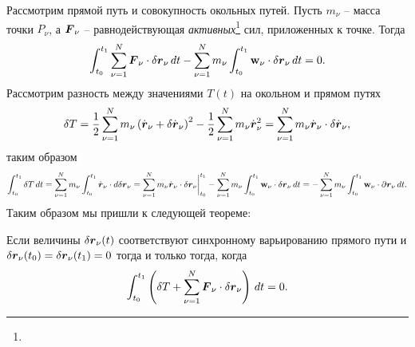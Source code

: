 Рассмотрим прямой путь и совокупность окольных путей. Пусть $m_\nu$ -- масса точки $P_\nu$, а $\mbox{\boldmath $F$}_\nu$ -- равнодействующая \textit{активных}\footnote{
} сил, приложенных к точке. Тогда
\begin{equation*}
    \int_{t_0}^{t_1} \sum_{\nu=1}^{N} \mbox{\boldmath $F$}_\nu \cdot \delta \mbox{\boldmath $r$}_\nu \, d t - 
    \sum_{\nu=1}^N m_\nu \int_{t_0}^{t_1} \mbox{\boldmath $\mathrm{w}$}_\nu \cdot \delta \mbox{\boldmath $r$}_\nu \, d t = 0.
\end{equation*}
Рассмотрим разность между значениями $T(t)$ на окольном и прямом путях
\begin{equation*}
    \delta T = \frac{1}{2} \sum_{\nu=1}^N m_\nu \left(
        \dot{\mbox{\boldmath $r$}}_\nu + \delta \dot{\mbox{\boldmath $r$}}_\nu
    \right)^2 - \frac{1}{2} \sum_{\nu=1}^N m_\nu \dot{\mbox{\boldmath $r$}}_\nu^2 = 
    \sum_{\nu=1}^N m_\nu \dot{\mbox{\boldmath $r$}}_\nu \cdot \delta \dot{\mbox{\boldmath $r$}}_\nu,
\end{equation*} 
таким образом
\begin{equation*}
     \int_{t_0}^{t_1} \delta T \, d t = \sum_{\nu=1}^N  m_\nu \int_{t_0}^{t_1} \dot{\mbox{\boldmath $r$}}_\nu \cdot d \delta \mbox{\boldmath $r$}_\nu = \sum_{\nu=1}^N m_\nu \dot{\mbox{\boldmath $r$}}_\nu \cdot \delta \mbox{\boldmath $r$}_\nu 
    \bigg|_{t_0}^{t_1} - \sum_{\nu=1}^N m_\nu \int_{t_0}^{t_1} \mbox{\boldmath $\mathrm{w}$}_\nu \cdot \delta \mbox{\boldmath $r$}_\nu \, d t = 
    - \sum_{\nu=1}^N  m_\nu \int_{t_0}^{t_1} \mbox{\boldmath $\mathrm{w}$}_\nu \cdot \partial \mbox{\boldmath $r$}_\nu \, d t.
\end{equation*}
Таким образом мы пришли к следующей теореме:

\begin{to_thr}
     Если величины $\delta \mbox{\boldmath $r$}_\nu (t)$ соответствуют синхронному варьированию прямого пути и $\delta \mbox{\boldmath $r$}_\nu (t_0) = \delta \mbox{\boldmath $r$}_\nu (t_1) = 0$ тогда и только тогда, когда
     \begin{equation*}
         \int_{t_0}^{t_1} \left(
            \delta T + \sum_{\nu=1}^N \mbox{\boldmath $F$}_\nu \cdot \delta \mbox{\boldmath $r$}_\nu
         \right) \, d t = 0.
     \end{equation*}
\end{to_thr}

